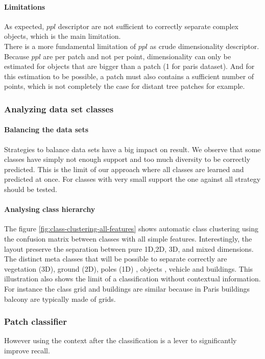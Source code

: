 			 \paragraph{Limitations}
				 
				 As expected, $ppl$ descriptor are  not sufficient to correctly separate complex objects, which is the main limitation.
				 \\
				 There is a more fundamental limitation of $ppl$ as crude dimensionality descriptor. Because $ppl$ are per patch and not per point, dimensionality can only be estimated for objects that are bigger than a patch (1 \cubic \meter for paris dataset).
				 And for this estimation to be possible, a patch must also contains a sufficient number of points, which is not completely the case for distant tree patches for example.
			 
			 
		 \subsubsection{Analyzing data set classes}
			 \paragraph{Balancing the data sets}
				 Strategies to balance data sets have a big impact on result. We observe that some classes have simply not enough support and too much diversity to be correctly predicted.
				 This is the limit of our approach where all classes are learned and predicted at once. For classes with very small support the one against all strategy should be tested. 
				 
			 \paragraph{Analysing class hierarchy}
				 The figure \ref{fig:class-clustering-all-features} shows automatic class clustering using the confusion matrix between classes with all simple features.
				 Interestingly, the layout preserve the separation between pure 1D,2D, 3D, and mixed dimensions.
				 The distinct meta classes that will be possible to separate correctly are vegetation (3D), ground (2D), poles (1D) , objects , vehicle and buildings.
				 This illustration also shows the limit of a classification without contextual information. For instance the class grid and buildings are similar because in Paris buildings balcony are typically made of grids.
				 
		 \subsubsection{Patch classifier}
			 	However using the context after the classification is a lever to significantly improve recall.
			 	
